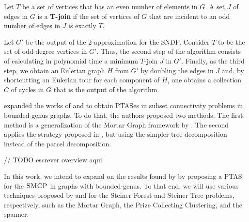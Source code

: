 Let \(T\) be a set of vertices that has an even number of elements in \(G\). A set \(J\) of edges in \(G\) is a \textbf{T-join} if the set of vertices of \(G\) that are incident to an odd number of edges in \(J\) is exactly \(T\).

Let \(G'\) be the output of the 2-approximation for the SNDP. Consider \(T\) to be the set of odd-degree vertices in \(G'\). Thus, the second step of the algorithm consists of calculating in polynomial time a minimum \(T\)-join \(J\) in \(G'\). Finally, as the third step, we obtain an Eulerian graph \(H\) from \(G'\) by doubling the edges in \(J\) and, by shortcutting an Eulerian tour for each component of \(H\), one obtains a collection \(C\) of cycles in \(G\) that is the output of the algorithm.


\cite{Borradaile2012} expanded the works of \cite{Borradaile2009b} and \cite{KleinTSP} to obtain PTASes in subset connectivity problems in bounded-genus graphs. To do that, the authors proposed two methods. The first method is a generalization of the Mortar Graph framework by \cite{KleinTSP}. The second applies the strategy proposed in \cite{Borradaile2009b}, but using the simpler tree decomposition instead of the parcel decomposition.

// TODO escrever overview aqui

In this work, we intend to expand on the results found by \cite{LINTZMAYER2020134} by proposing a PTAS for the \(\textsc{SMCP}\) in graphs with bounded-genus. To that end, we will use various techniques proposed by \cite{Bateni} and \cite{Borradaile2009b} for the Steiner Forest and Steiner Tree problems, respectively, such as the Mortar Graph, the Prize Collecting Clustering, and the spanner.
